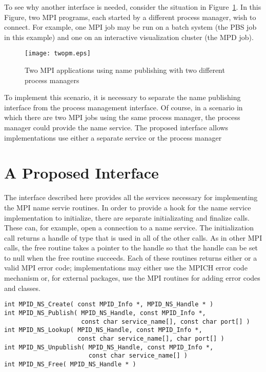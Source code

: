 \documentclass{article}
\begin{document}
To see why another interface is needed, consider the situation in
Figure~\ref{fig:multiple-pm}.  In this Figure, two MPI programs, each
started by a different process manager, wish to connect.  For example,
one MPI job may be run on a batch system (the PBS job in this example)
and one on an interactive visualization cluster (the MPD job).  

\begin{figure}
\centerline{\texttt{[image: twopm.eps]}}
\caption{Two MPI applications using name publishing with two different
process managers}\label{fig:multiple-pm}
\end{figure}

To implement this scenario, it is necessary to separate the name
publishing interface from the process management interface.  
Of course, in a scenario in which there are two MPI jobs using the
same process manager, the process manager could provide the name
service.  The proposed interface allows implementations use either a
separate service or the process manager

\section{A Proposed Interface}
\label{sec:name-interface}

The interface described here provides all the services necessary for
implementing the MPI name servie routines.  In order to provide a hook
for the name service implementation to initialize, there are separate
initializating and finalize calls.  These can, for example, open a
connection to a name service.  The initialization call returns a
handle of type  that is used in all of the other
calls.  As in other MPI calls, the free routine takes a pointer to the
handle so that the handle can be set to null when the free routine
succeeds.  Each of these routines returns either  or
a valid MPI error code; implementations may either use the MPICH
error code mechanism or, for external packages, use the MPI routines
for adding error codes and classes.

\begin{verbatim}
int MPID_NS_Create( const MPID_Info *, MPID_NS_Handle * )
int MPID_NS_Publish( MPID_NS_Handle, const MPID_Info *, 
                     const char service_name[], const char port[] )
int MPID_NS_Lookup( MPID_NS_Handle, const MPID_Info *,
                    const char service_name[], char port[] )
int MPID_NS_Unpublish( MPID_NS_Handle, const MPID_Info *, 
                       const char service_name[] )
int MPID_NS_Free( MPID_NS_Handle * )
\end{verbatim}
\end{document}
